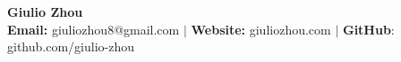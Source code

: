 \documentclass{article}
\begin{document}
\newcommand{\HRule}{\rule{\linewidth}{0.2mm}}


\begin{center}
\textbf{{\LARGE Giulio Zhou}} \\ \vspace{1mm}
\textbf{\fontsize{11}{13.2} Email:} giuliozhou8@gmail.com  $|$ \textbf{Website:} giuliozhou.com $|$ \textbf{GitHub}: github.com/giulio-zhou\\[2mm]
\end{center}

\end{document}
